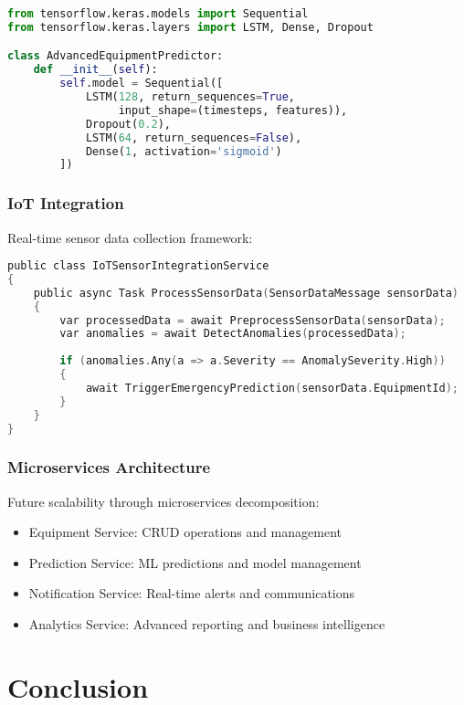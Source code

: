 \documentclass[12pt,a4paper]{report}
\begin{document}
\begin{lstlisting}[language=Python, caption=Proposed Neural Network Architecture]
from tensorflow.keras.models import Sequential
from tensorflow.keras.layers import LSTM, Dense, Dropout

class AdvancedEquipmentPredictor:
    def __init__(self):
        self.model = Sequential([
            LSTM(128, return_sequences=True, 
                 input_shape=(timesteps, features)),
            Dropout(0.2),
            LSTM(64, return_sequences=False),
            Dense(1, activation='sigmoid')
        ])
\end{lstlisting}

\subsection{IoT Integration}

Real-time sensor data collection framework:

\begin{lstlisting}[language=C, caption=IoT Integration Service]
public class IoTSensorIntegrationService
{
    public async Task ProcessSensorData(SensorDataMessage sensorData)
    {
        var processedData = await PreprocessSensorData(sensorData);
        var anomalies = await DetectAnomalies(processedData);
        
        if (anomalies.Any(a => a.Severity == AnomalySeverity.High))
        {
            await TriggerEmergencyPrediction(sensorData.EquipmentId);
        }
    }
}
\end{lstlisting}

\subsection{Microservices Architecture}

Future scalability through microservices decomposition:

\begin{itemize}
    \item Equipment Service: CRUD operations and management
    \item Prediction Service: ML predictions and model management  
    \item Notification Service: Real-time alerts and communications
    \item Analytics Service: Advanced reporting and business intelligence
\end{itemize}

\chapter{Conclusion}
\end{document}
